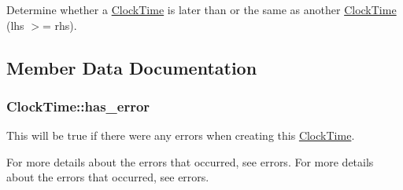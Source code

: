 Determine whether a \hyperlink{structClockTime}{Clock\-Time} is later than or the same as another \hyperlink{structClockTime}{Clock\-Time} (lhs $>$= rhs). 



\subsection{Member Data Documentation}
\hypertarget{structClockTime_ab04bad96a5d91e8a29b61a1802e5faba}{
\subsubsection[{has\-\_\-error}]{ Clock\-Time\-::has\-\_\-error}}\label{structClockTime_ab04bad96a5d91e8a29b61a1802e5faba}


This will be true if there were any errors when creating this \hyperlink{structClockTime}{Clock\-Time}. 

For more details about the errors that occurred, see {\ttfamily errors}. For more details about the errors that occurred, see {\ttfamily errors}.

